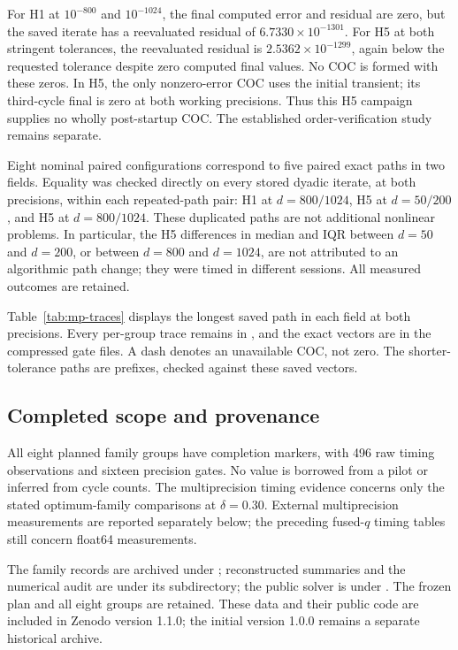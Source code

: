 \documentclass[11pt]{article}
\begin{document}
For H1 at $10^{-800}$ and $10^{-1024}$, the final computed error and residual are zero, but the saved iterate has a reevaluated residual of $6.7330\times10^{-1301}$. For H5 at both stringent tolerances, the reevaluated residual is $2.5362\times10^{-1299}$, again below the requested tolerance despite zero computed final values. No COC is formed with these zeros. In H5, the only nonzero-error COC uses the initial transient; its third-cycle final is zero at both working precisions. Thus this H5 campaign supplies no wholly post-startup COC. The established order-verification study remains separate.

Eight nominal paired configurations correspond to five paired exact paths in two fields. Equality was checked directly on every stored dyadic iterate, at both precisions, within each repeated-path pair: H1 at $d=800/1024$, H5 at $d=50/200$, and H5 at $d=800/1024$. These duplicated paths are not additional nonlinear problems. In particular, the H5 differences in median and IQR between $d=50$ and $d=200$, or between $d=800$ and $d=1024$, are not attributed to an algorithmic path change; they were timed in different sessions. All measured outcomes are retained.

Table~\ref{tab:mp-traces} displays the longest saved path in each field at both precisions. Every per-group trace remains in , and the exact vectors are in the compressed gate files. A dash denotes an unavailable COC, not zero. The shorter-tolerance paths are prefixes, checked against these saved vectors.

\subsection{Completed scope and provenance}
All eight planned family groups have completion markers, with 496 raw timing observations and sixteen precision gates. No value is borrowed from a pilot or inferred from cycle counts. The multiprecision timing evidence concerns only the stated optimum-family comparisons at $\delta=0.30$. External multiprecision measurements are reported separately below; the preceding fused-$q$ timing tables still concern float64 measurements.

The family records are archived under ; reconstructed summaries and the numerical audit are under its  subdirectory; the public solver is under . The frozen plan and all eight groups are retained. These data and their public code are included in Zenodo version 1.1.0; the initial version 1.0.0 remains a separate historical archive.
\end{document}
